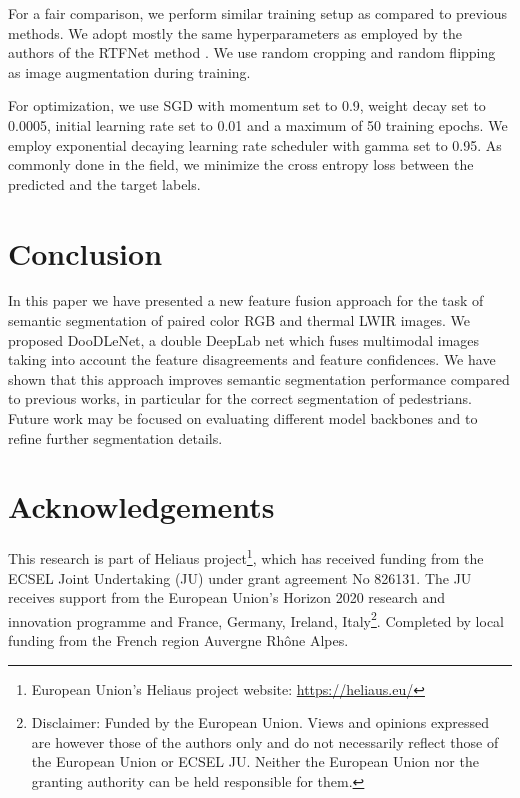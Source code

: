\documentclass[10pt,twocolumn,letterpaper]{article}
\begin{document}
For a fair comparison, we perform similar training setup as compared to previous methods. We adopt mostly the same hyperparameters as employed by the authors of the RTFNet method \cite{Sun2019}. We use random cropping and random flipping as image augmentation during training.

For optimization, we use SGD with momentum set to 0.9, weight decay set to 0.0005, initial learning rate set to 0.01 and a maximum of 50 training epochs. We employ exponential decaying learning rate scheduler with gamma set to 0.95. As commonly done in the field, we minimize the cross entropy loss between the predicted and the target labels.

\section{Conclusion}

In this paper we have presented a new feature fusion approach for the task of semantic segmentation of paired color RGB and thermal LWIR images. We proposed DooDLeNet, a double DeepLab net which fuses multimodal images taking into account the feature disagreements and feature confidences. We have shown that this approach improves semantic segmentation performance compared to previous works, in particular for the correct segmentation of pedestrians. Future work may be focused on evaluating different model backbones and to refine further segmentation details.

\section{Acknowledgements}

This research is part of Heliaus project\footnote{European Union's Heliaus  project website: \url{https://heliaus.eu/}}, which has received funding from the ECSEL Joint Undertaking (JU) under grant agreement No 826131. The JU receives support from the European Union’s Horizon 2020 research and innovation programme and France, Germany, Ireland, Italy\footnote{Disclaimer: Funded by the European Union. Views and opinions expressed are however those of the authors only and do not necessarily reflect those of the European Union or ECSEL JU. Neither the European Union nor the granting authority can be held responsible for them.}. Completed by local funding from the French region Auvergne Rhône Alpes.

 

\end{document}
